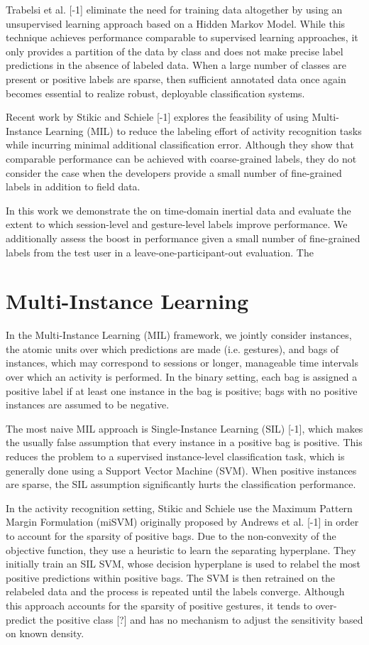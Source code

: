 \documentclass{sigchi}
\begin{document}
Trabelsi et al. [-1] eliminate the need for training data altogether by using an unsupervised learning approach based on a Hidden Markov Model. While this technique achieves performance comparable to supervised learning approaches, it only provides a partition of the data by class and does not make precise label predictions in the absence of labeled data. When a large number of classes are present or positive labels are sparse, then sufficient annotated data once again becomes essential to realize robust, deployable classification systems.

Recent work by Stikic and Schiele [-1] explores the feasibility of using Multi-Instance Learning (MIL) to reduce the labeling effort of activity recognition tasks while incurring minimal additional classification error. Although they show that comparable performance can be achieved with coarse-grained labels, they do not consider the case when the developers provide a small number of fine-grained labels in addition to field data.

In this work we demonstrate the on time-domain inertial data and evaluate the extent to which session-level and gesture-level labels improve performance. We additionally assess the boost in performance given a small number of fine-grained labels from the test user in a leave-one-participant-out evaluation. The

\section{Multi-Instance Learning}

In the Multi-Instance Learning (MIL) framework, we jointly consider instances, the atomic units over which predictions are made (i.e. gestures), and bags of instances, which may correspond to sessions or longer, manageable time intervals over which an activity is performed. In the binary setting, each bag is assigned a positive label if at least one instance in the bag is positive; bags with no positive instances are assumed to be negative.

The most naive MIL approach is Single-Instance Learning (SIL) [-1], which makes the usually false assumption that every instance in a positive bag is positive. This reduces the problem to a supervised instance-level classification task, which is generally done using a Support Vector Machine (SVM). When positive instances are sparse, the SIL assumption significantly hurts the classification performance.

In the activity recognition setting, Stikic and Schiele use the Maximum Pattern Margin Formulation (miSVM) originally proposed by Andrews et al. [-1] in order to account for the sparsity of positive bags. Due to the non-convexity of the objective function, they use a heuristic to learn the separating hyperplane. They initially train an SIL SVM, whose decision hyperplane is used to relabel the most positive predictions within positive bags. The SVM is then retrained on the relabeled data and the process is repeated until the labels converge. Although this approach accounts for the sparsity of positive gestures, it tends to over-predict the positive class [?] and has no mechanism to adjust the sensitivity based on known density.
\end{document}
